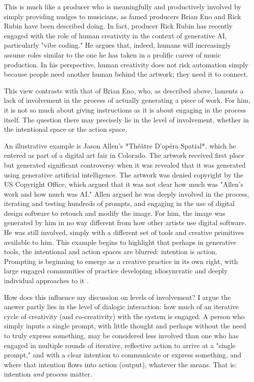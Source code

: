 This is much like a producer who is meaningfully and productively involved by simply providing nudges to musicians, as famed producers Brian Eno and Rick Rubin have been described doing. In fact, producer Rick Rubin has recently engaged with the role of human creativity in the context of generative AI, particularly "vibe coding." He argues that, indeed, humans will increasingly assume roles similar to the one he has taken in a prolific career of music production. In his perspective, human creativity does not risk automation simply because people need another human behind the artwork; they need it to connect.

This view contrasts with that of Brian Eno, who, as described above, laments a lack of involvement in the process of actually generating a piece of work. For him, it is not so much about giving instructions as it is about engaging in the process itself. The question there may precisely lie in the level of involvement, whether in the intentional space or the action space.

An illustrative example is Jason Allen's *Théâtre D'opéra Spatial*, which he entered as part of a digital art fair in Colorado. The artwork received first place but generated significant controversy when it was revealed that it was generated using generative artificial intelligence. The artwork was denied copyright by the US Copyright Office, which argued that it was not clear how much was "Allen's work and how much was AI." Allen argued he was deeply involved in the process, iterating and testing hundreds of prompts, and engaging in the use of digital design software to retouch and modify the image. For him, the image was generated by him in no way different from how other artists use digital software. He was still involved, simply with a different set of tools and creative primitives available to him. This example begins to highlight that perhaps in generative tools, the intentional and action spaces are blurred: intention is action. Prompting is beginning to emerge as a creative practice in its own right, with large engaged communities of practice developing idiosyncratic and deeply individual approaches to it \cite{Chang2023-tv}.

How does this influence my discussion on levels of involvement? I argue the answer partly lies in the level of dialogic interaction: how much of an iterative cycle of creativity (and co-creativity) with the system is engaged. A person who simply inputs a single prompt, with little thought and perhaps without the need to truly express something, may be considered less involved than one who has engaged in multiple rounds of iterative, reflective action to arrive at a "single prompt," and with a clear intention to communicate or express something, and where that intention flows into action (output), whatever the means. That is: intention \textit{and} process matter.


